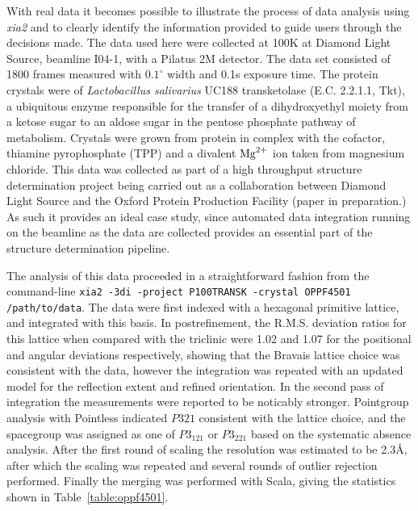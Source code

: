\documentclass[preprint,pdf]{iucr}
\begin{document}
With real data it becomes possible to illustrate the process of data
analysis using \emph{xia2} and to clearly identify the information
provided to guide users through the decisions made. The data
used here were collected at 100K at Diamond Light Source, beamline
I04-1, with a Pilatus 2M detector. The data set consisted of 1800
frames measured with $0.1^{\circ}$ width and 0.1s exposure time.
The protein crystals were of
\emph{Lactobacillus salivarius} UC188 transketolase (E.C. 2.2.1.1, Tkt), a
ubiquitous enzyme responsible for the transfer of a dihydroxyethyl
moiety from a ketose sugar to an aldose sugar in the pentose phosphate
pathway of metabolism. Crystals were grown from protein in complex
with the cofactor, thiamine pyrophosphate (TPP) and a divalent $\rm{Mg}^{2+}$
ion taken from magnesium chloride. This data was collected as part of
a high throughput structure determination project being carried out as
a collaboration between Diamond Light Source and the Oxford Protein
Production Facility (paper in preparation.) As such it provides an
ideal case study, since automated data integration running on the
beamline as the data are collected provides an essential part of the
structure determination pipeline. 

The analysis of this data proceeded in a straightforward fashion from
the command-line 
\verb|xia2 -3di -project P100TRANSK -crystal OPPF4501 /path/to/data|.
The data were first indexed with a hexagonal primitive lattice, and
integrated with this basis. In postrefinement, the R.M.S. deviation
ratios for this lattice when compared with the triclinic were 1.02 and
1.07 for the positional and angular deviations respectively, showing
that the Bravais lattice choice was consistent with the data, however
the integration was repeated with an updated model for the reflection
extent and refined orientation. In the second pass of integration the
measurements were reported to be noticably stronger. Pointgroup
analysis with Pointless indicated $P321$ consistent with the lattice
choice, and the spacegroup was assigned as one of $P3_121$ or $P3_221$
based on the systematic absence analysis. After the first round of
scaling the resolution was estimated to be 2.3\AA, after which
the scaling was repeated and several rounds of outlier rejection
performed. Finally the merging was performed with Scala, giving the
statistics shown in Table~\ref{table:oppf4501}. 
\end{document}
